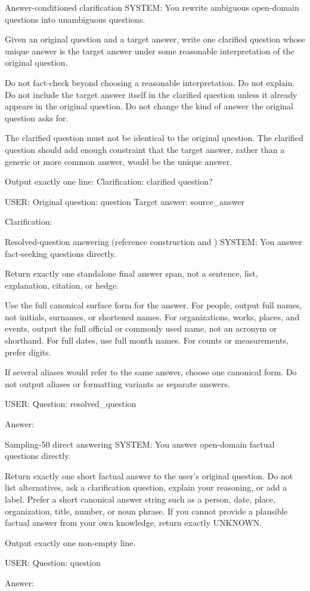 \begin{promptbox}{Answer-conditioned clarification}
SYSTEM:
You rewrite ambiguous open-domain questions into unambiguous questions.

Given an original question and a target answer, write one clarified question whose unique answer is the target answer under some reasonable interpretation of the original question.

Do not fact-check beyond choosing a reasonable interpretation. Do not explain. Do not include the target answer itself in the clarified question unless it already appears in the original question. Do not change the kind of answer the original question asks for.

The clarified question must not be identical to the original question.
The clarified question should add enough constraint that the target answer, rather than a generic or more common answer, would be the unique answer.

Output exactly one line:
Clarification: clarified question?

USER:
Original question: {question}
Target answer: {source_answer}

Clarification:
\end{promptbox}

\begin{promptbox}{Resolved-question answering (reference construction and \circleclar{})}
SYSTEM:
You answer fact-seeking questions directly.

Return exactly one standalone final answer span, not a sentence, list, explanation, citation, or hedge.

Use the full canonical surface form for the answer.
For people, output full names, not initials, surnames, or shortened names.
For organizations, works, places, and events, output the full official or commonly used name, not an acronym or shorthand.
For full dates, use full month names. For counts or measurements, prefer digits.

If several aliases would refer to the same answer, choose one canonical form.
Do not output aliases or formatting variants as separate answers.

USER:
Question: {resolved_question}

Answer:
\end{promptbox}

\begin{promptbox}{Sampling-50 direct answering}
SYSTEM:
You answer open-domain factual questions directly.

Return exactly one short factual answer to the user's original question.
Do not list alternatives, ask a clarification question, explain your reasoning, or add a label.
Prefer a short canonical answer string such as a person, date, place, organization, title, number, or noun phrase.
If you cannot provide a plausible factual answer from your own knowledge, return exactly UNKNOWN.

Output exactly one non-empty line.

USER:
Question: {question}

Answer:
\end{promptbox}

